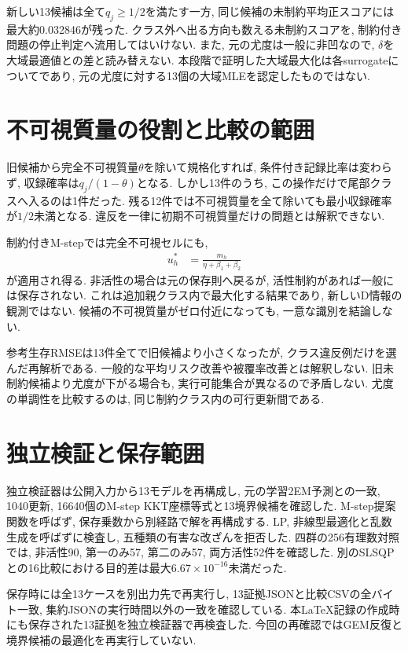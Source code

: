 新しい13候補は全て$q_j\ge1/2$を満たす一方,
同じ候補の未制約平均正スコアには最大約0.032846が残った.
クラス外へ出る方向も数える未制約スコアを,
制約付き問題の停止判定へ流用してはいけない.
また, 元の尤度は一般に非凹なので,
$\delta$を大域最適値との差と読み替えない.
本段階で証明した大域最大化は各surrogateについてであり,
元の尤度に対する13個の大域MLEを認定したものではない.

\section{不可視質量の役割と比較の範囲}
\label{sec:stage24_invisible_mass}

旧候補から完全不可視質量$\theta$を除いて規格化すれば,
条件付き記録比率は変わらず, 収録確率は$q_j/(1-\theta)$となる.
しかし13件のうち, この操作だけで尾部クラスへ入るのは1件だった.
残る12件では不可視質量を全て除いても最小収録確率が$1/2$未満となる.
違反を一律に初期不可視質量だけの問題とは解釈できない.

制約付きM-stepでは完全不可視セルにも,
\begin{align}
u_h^*&=\frac{m_h}{\eta+\beta_1+\beta_2}
\label{eq:stage24_invisible_update}
\end{align}
が適用され得る.
非活性の場合は元の保存則へ戻るが, 活性制約があれば一般には保存されない.
これは追加親クラス内で最大化する結果であり, 新しいD情報の観測ではない.
候補の不可視質量がゼロ付近になっても, 一意な識別を結論しない.

参考生存RMSEは13件全てで旧候補より小さくなったが,
クラス違反例だけを選んだ再解析である.
一般的な平均リスク改善や被覆率改善とは解釈しない.
旧未制約候補より尤度が下がる場合も, 実行可能集合が異なるので矛盾しない.
尤度の単調性を比較するのは, 同じ制約クラス内の可行更新間である.

\section{独立検証と保存範囲}
\label{sec:stage24_record}

独立検証器は公開入力から13モデルを再構成し,
元の学習2EM予測との一致, 1040更新,
16640個のM-step KKT座標等式と13境界候補を確認した.
M-step提案関数を呼ばず, 保存乗数から別経路で解を再構成する.
LP, 非線型最適化と乱数生成を呼ばずに検査し,
五種類の有害な改ざんを拒否した.
四群の256有理数対照では, 非活性90, 第一のみ57,
第二のみ57, 両方活性52件を確認した.
別のSLSQPとの16比較における目的差は最大$6.67\times10^{-16}$未満だった.

保存時には全13ケースを別出力先で再実行し,
13証拠JSONと比較CSVの全バイト一致,
集約JSONの実行時間以外の一致を確認している.
本LaTeX記録の作成時にも保存された13証拠を独立検証器で再検査した.
今回の再確認ではGEM反復と境界候補の最適化を再実行していない.

